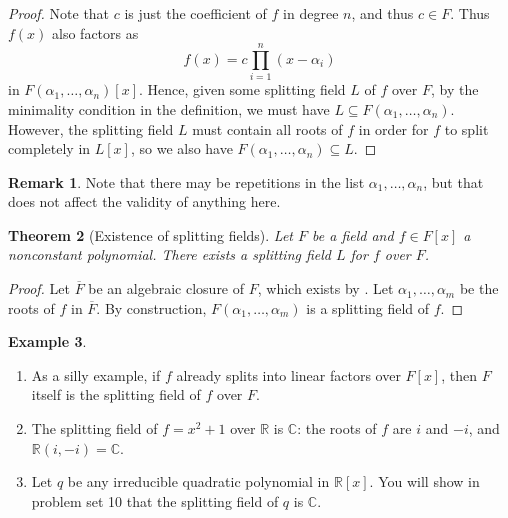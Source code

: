 \documentclass[12pt]{report}
\newtheorem{theorem}{Theorem}[chapter]
\numberwithin{equation}{section}
\numberwithin{theorem}{chapter}
\theoremstyle{definition}
\newtheorem{example}[theorem]{Example}
\newtheorem*{basic properties}{Basic Properties}
\newtheorem*{Important Remark}{Important Remark}
\newtheorem{remark}[theorem]{Remark}
\newcommand{\R}{\mathbb{R}}
\newcommand{\C}{\mathbb{C}}
\begin{document}
\begin{proof}
Note that $c$ is just the coefficient of $f$ in degree $n$, and thus $c \in F$. Thus $f(x)$ also factors as 
$$f(x) = c \prod_{i=1}^n (x - \alpha_i)$$ 
in $F(\alpha_1,\ldots,\alpha_n)[x]$. Hence, given some splitting field $L$ of $f$ over $F$, by the minimality condition in the definition, we must have $L \subseteq F(\alpha_1,\dots, \alpha_n)$. However, the splitting field $L$ must contain all roots of $f$ in order for $f$ to split completely in $L[x]$, so we also have $F(\alpha_1,\dots, \alpha_n) \subseteq L$.
\end{proof}


\begin{remark}
	Note that there may be repetitions in the list $\alpha_1,\ldots, \alpha_n$, but that does not affect the validity of anything here.
\end{remark}

%

\begin{theorem}[Existence of splitting fields]\label{existence of splitting fields}
Let $F$ be a field and $f \in F[x]$ a nonconstant polynomial. There exists a splitting field $L$ for $f$ over $F$.
\end{theorem}

\begin{proof} 
Let $\overline{F}$ be an algebraic closure of $F$, which exists by . Let $\alpha_1, \ldots, \alpha_m$ be the roots of $f$ in $\overline{F}$. By construction, $F(\alpha_1, \ldots, \alpha_m)$ is a splitting field of $f$.
\end{proof}




\begin{example}$\,$
\begin{enumerate}[label=\alph*),leftmargin=15pt]
\item As a silly example, if $f$ already splits into linear factors over $F[x]$, then $F$ itself is the splitting field of $f$ over $F$.
\item The splitting field of $f = x^2 + 1$ over $\R$ is $\C$: the roots of $f$ are $i$ and $-i$, and $\R(i,-i) = \C$.
\item Let $q$ be any irreducible quadratic polynomial in $\R[x]$. You will show in problem set 10 that the splitting field of $q$ is $\C$.
\end{enumerate}
\end{example}
\end{document}
